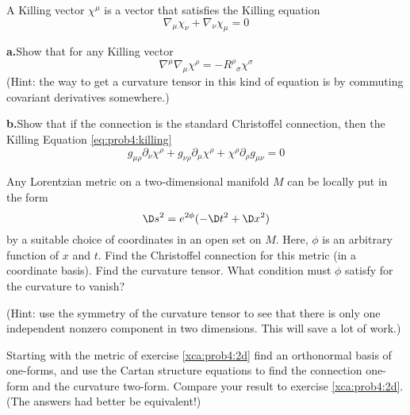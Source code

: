 \begin{xca}\label{xca:prob4:killing}
A Killing vector $\chi^{\mu}$ is a vector that satisfies the
Killing equation
\begin{equation}\label{eq:prob4:killing}
\nabla_{\mu}\chi_{\nu}+\nabla_{\nu}\chi_{\mu}=0
\end{equation}

\noindent\textbf{a.\quad}Show that for any Killing vector
\begin{equation}
\nabla^{\mu}\nabla_{\mu}\chi^{\rho}=-{R^{\rho}}_{\sigma}\chi^{\sigma}
\end{equation}
(Hint: the way to get a curvature tensor in this kind of equation is by commuting covariant
derivatives somewhere.)

\medbreak\noindent\textbf{b.\quad}Show that if the connection is the standard Christoffel connection, then the Killing
Equation \eqref{eq:prob4:killing}
\begin{equation}
g_{\mu\rho}\partial_{\nu}\chi^{\rho}
+g_{\nu\rho}\partial_{\mu}\chi^{\rho}
+\chi^{\rho}\partial_{\rho}g_{\mu\nu}=0
\end{equation}
\end{xca}

\begin{xca}\label{xca:prob4:2d}
Any Lorentzian metric on a two-dimensional manifold $M$ can be
locally put in the form 
\begin{equation}
\D s^2 = e^{2\phi} (-\D t^2 +\D x^2)
\end{equation}
by a suitable choice of coordinates in an open set on $M$. Here,
$\phi$ is an arbitrary function of $x$ and $t$. Find the
Christoffel connection for this metric (in a coordinate
basis). Find the curvature tensor. What condition must $\phi$
satisfy for the curvature to vanish? 

(Hint: use the symmetry of the curvature tensor to see that there
is only one independent nonzero component in two dimensions. This
will save a lot of work.) 
\end{xca}
\begin{xca}
Starting with the metric of exercise \ref{xca:prob4:2d} find an
orthonormal basis of one-forms, and use the Cartan structure
equations to find the connection one-form and the curvature
two-form. Compare your result to exercise \ref{xca:prob4:2d}. (The answers had
better be equivalent!)
\end{xca}

